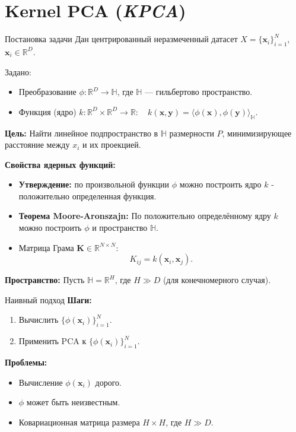 \section{Kernel PCA (\textit{KPCA})}

\begin{frame}[allowframebreaks]{Постановка задачи}
    Дан центрированный неразмеченный датасет $X = \{\boldsymbol{x}_i\}_{i=1}^N$, $\boldsymbol{x}_i \in \mathbb{R}^D$.

    Задано:
    \begin{itemize}
        \item Преобразование $\phi: \mathbb{R}^D \to \mathbb{H}$, где $\mathbb{H}$ — гильбертово пространство.
        \item Функция (ядро) $k: \mathbb{R}^D \times \mathbb{R}^D \to \mathbb{R}:\quad k(\boldsymbol{x}, \boldsymbol{y}) = \langle\phi(\boldsymbol{x}), \phi(\boldsymbol{y})\rangle_{\mathbb{H}}.$
    \end{itemize}

    \textbf{Цель:} Найти линейное подпространство в $\mathbb{H}$ размерности $P$, минимизирующее расстояние между $x_i$ и их проекцией.

    \framebreak

    \textbf{Свойства ядерных функций:}
    \begin{itemize}
        \item \textbf{Утверждение:} по произвольной функции $\phi$ можно построить ядро $k$ - положительно определенная функция.
        \item \textbf{Теорема Moore-Aronszajn:} По положительно определённому ядру $k$ можно построить $\phi$ и пространство $\mathbb{H}$.
        \item Матрица Грама $\mathbf{K} \in \mathbb{R}^{N \times N}$:
              \begin{equation*}
                  K_{ij} = k(\boldsymbol{x}_i, \boldsymbol{x}_j).
              \end{equation*}
    \end{itemize}

    \textbf{Пространство:} Пусть $\mathbb{H} = \mathbb{R}^H$, где $H \gg D$ (для конечномерного случая).
\end{frame}

\begin{frame}{Наивный подход}
    \textbf{Шаги:}
    \begin{enumerate}
        \item Вычислить $\{\phi(\boldsymbol{x}_i)\}_{i=1}^N$.
        \item Применить PCA к $\{\phi(\boldsymbol{x}_i)\}_{i=1}^N$.
    \end{enumerate}

    \textbf{Проблемы:}
    \begin{itemize}
        \item Вычисление $\phi(\boldsymbol{x}_i)$ дорого.
        \item $\phi$ может быть неизвестным.
        \item Ковариационная матрица размера $H \times H$, где $H \gg D$.
    \end{itemize}
\end{frame}


